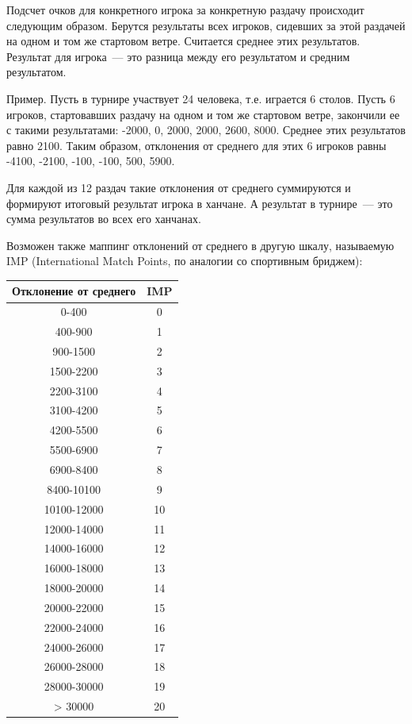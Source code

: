 \begin{additional}
\vspace{0.3cm}

Подсчет очков для конкретного игрока за конкретную раздачу происходит следующим образом. Берутся результаты всех игроков, сидевших за этой раздачей на одном и том же стартовом ветре. Считается среднее этих результатов. Результат для игрока~--- это разница между его результатом и средним результатом.

\vspace{0.3cm}

Пример. Пусть в турнире участвует 24 человека, т.е. играется 6 столов. Пусть 6 игроков, стартовавших раздачу на одном и том же стартовом ветре, закончили ее с такими результатами: -2000, 0, 2000, 2000, 2600, 8000. Среднее этих результатов равно 2100. Таким образом, отклонения от среднего для этих 6 игроков равны -4100, -2100, -100, -100, 500, 5900.

\vspace{0.3cm}

Для каждой из 12 раздач такие отклонения от среднего суммируются и формируют итоговый результат игрока в ханчане. А результат в турнире~--- это сумма результатов во всех его ханчанах.

\vspace{0.3cm}

Возможен также маппинг отклонений от среднего в другую шкалу, называемую IMP (International Match Points, по аналогии со спортивным бриджем):

\begin{tabular}{|c|c|}
	\hline
	Отклонение от среднего & IMP \\
	\hline
	0-400 & 0 \\
	\hline
	400-900 & 1 \\
	\hline
	900-1500 & 2 \\
	\hline
	1500-2200 & 3 \\
	\hline
	2200-3100 & 4 \\
	\hline
	3100-4200 & 5 \\
	\hline
	4200-5500 & 6 \\
	\hline
	5500-6900 & 7 \\
	\hline
	6900-8400 & 8 \\
	\hline
	8400-10100 & 9 \\
	\hline
	10100-12000 & 10 \\
	\hline
	12000-14000 & 11 \\
	\hline
	14000-16000 & 12 \\
	\hline
	16000-18000 & 13 \\
	\hline
	18000-20000 & 14 \\
	\hline
	20000-22000 & 15 \\
	\hline
	22000-24000 & 16 \\
	\hline
	24000-26000 & 17 \\
	\hline
	26000-28000 & 18 \\
	\hline
	28000-30000 & 19 \\
	\hline
	> 30000 & 20 \\
	\hline
\end{tabular}


\end{additional}
